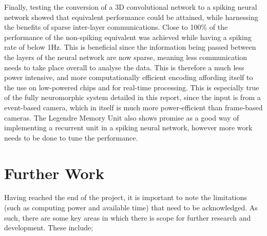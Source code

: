 Finally, testing the conversion of a 3D convolutional network to a spiking neural network showed that equivalent performance could be attained, while harnessing the benefits of sparse inter-layer communications. Close to 100\% of the performance of the non-spiking equivalent was achieved while having a spiking rate of below 1Hz. This is beneficial since the information being passed between the layers of the neural network are now sparse, meaning less communication needs to take place overall to analyse the data. This is therefore a much less power intensive, and more computationally efficient encoding affording itself to the use on low-powered chips and for real-time processing. This is especially true of the fully neuromorphic system detailed in this report, since the input is from a event-based camera, which in itself is much more power-efficient than frame-based cameras. The Legendre Memory Unit also shows promise as a good way of implementing a recurrent unit in a spiking neural network, however more work needs to be done to tune the performance.

\section{Further Work}

Having reached the end of the project, it is important to note the limitations (such as computing power and available time) that need to be acknowledged. As such, there are some key areas in which there is scope for further research and development. These include;

